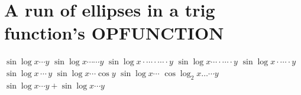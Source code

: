 \documentclass{article}
\begin{document}
\section{A run of ellipses in a trig function's OPFUNCTION}
$\sin\log x\cdots y$ $\sin\log x\cdots\cdots y$ $\sin\log x\cdot\cdots\cdot\cdots\cdot y$ $\sin\log x\cdots\cdot\cdots\cdot y$
$\sin\log x\cdot\cdots\cdot y$ $\sin\log x\,\cdots\,y$ $\sin\log x\cdots\cos y$ $\sin\log x\cdots$ $\cos\log_2 x\ldots\cdots y$
$\sin\log x\cdots y+\sin\log x\cdots y$

\end{document}
